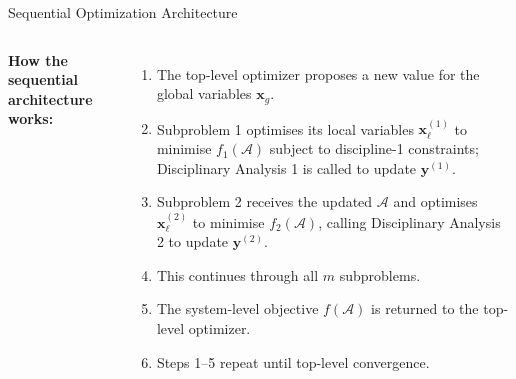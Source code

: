 \documentclass[aspectratio=169,10pt]{beamer}
\begin{document}
\begin{frame}[allowframebreaks]{Sequential Optimization Architecture}
\begin{columns}[T]
    \textbf{How the sequential architecture works:}
    \begin{enumerate}
      \item The top-level optimizer proposes a new value for the global
            variables $\mathbf{x}_g$.
      \item Subproblem 1 optimises its local variables
            $\mathbf{x}_\ell^{(1)}$ to minimise $f_1(\mathcal{A})$ subject
            to discipline-1 constraints; Disciplinary Analysis 1 is called
            to update $\mathbf{y}^{(1)}$.
      \item Subproblem 2 receives the updated $\mathcal{A}$ and optimises
            $\mathbf{x}_\ell^{(2)}$ to minimise $f_2(\mathcal{A})$, calling
            Disciplinary Analysis 2 to update $\mathbf{y}^{(2)}$.
      \item This continues through all $m$ subproblems.
      \item The system-level objective $f(\mathcal{A})$ is returned to the
            top-level optimizer.
      \item Steps 1--5 repeat until top-level convergence.
    \end{enumerate}
  \end{columns}

  \framebreak


\end{frame}
\end{document}
